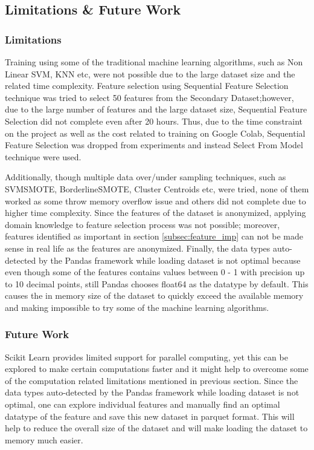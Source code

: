 \documentclass[twoside,11pt,a4paper]{article}
\begin{document}
\subsection{Limitations \& Future Work}

\subsubsection{Limitations}
Training using some of the traditional machine learning algorithms, such as Non Linear \acs{SVM}, \acf{KNN} etc, were not possible due to the large dataset size and the related time complexity. Feature selection using Sequential Feature Selection technique was tried to select 50 features from the Secondary Dataset;however, due to the large number of features and the large dataset size, Sequential Feature Selection did not complete even after 20 hours. Thus, due to the time constraint on the project as well as the cost related to training on Google Colab, Sequential Feature Selection was dropped from experiments and instead Select From Model technique were used.

Additionally, though multiple data over/under sampling techniques, such as SVMSMOTE, BorderlineSMOTE, Cluster Centroids etc,  were tried, none of them worked as some throw memory overflow issue and others did not complete due to higher time complexity. Since the features of the dataset is anonymized, applying domain knowledge to feature selection process was not possible; moreover, features identified as important in section \ref{subsec:feature_imp} can not be made sense in real life as the features are anonymized. 
Finally, the  data types auto-detected by the Pandas framework while loading dataset is not optimal because even though some of the features contains values between 0 - 1 with precision up to 10 decimal points, still Pandas chooses float64 as the datatype by default. This causes the in memory size of the dataset to quickly exceed the available memory and making impossible to try some of the machine learning algorithms.

\subsubsection{Future Work}
Scikit Learn \citep{scikit-learn} provides limited support for parallel computing, yet this can be explored to make certain computations faster and it might help to overcome some of the computation related limitations mentioned in previous section. Since the data types auto-detected by the Pandas framework while loading dataset is not optimal, one can explore individual features and manually find an optimal datatype of the feature and save this new dataset in parquet format. This will help to reduce the overall size of the dataset and will make loading the dataset to memory much easier.
\end{document}
